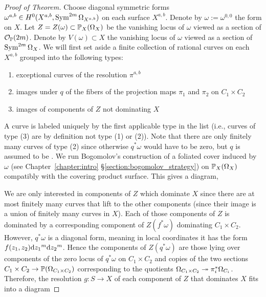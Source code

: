 \documentclass[main.tex]{subfiles}
\begin{document}
\begin{proof}[Proof of Theorem]
Choose diagonal symmetric forms $\omega^{a,b} \in H^0(X^{a,b}, \Sym^{2m}{\Omega_{X^{a,b}}})$ on each surface $X^{a,b}$. Denote by $\omega := \omega^{0,0}$ the form on $X$. Let $Z = Z(\omega) \subset \P_X(\Omega_X)$ be the vanishing locus of $\omega$ viewed as a section of $\cO_{\P}(2m)$. Denote by $V(\omega) \subset X$ the vanishing locus of $\omega$ viewed as a section of $\Sym^{2m}{\Omega_X}$. We will first set aside a finite collection of rational curves on each $X^{a,b}$ grouped into the following types:
\begin{enumerate}
    \item[(1)] exceptional curves of the resolution $\pi^{a,b}$
    \item[(2)] images under $q$ of the fibers of the projection maps $\pi_1$ and $\pi_2$ on $C_1 \times C_2$
    \item[(3)] images of components of $Z$ not dominating $X$ 
\end{enumerate}
A curve is labeled uniquely by the first applicable type in the list (i.e., curves of type (3) are by definition not type (1) or (2)). Note that there are only finitely many curves of type (2) since otherwise $q^* \omega$ would have to be zero, but $q$ is assumed to be \etale. We run Bogomolov's construction of a foliated cover induced by $\omega$ (see Chapter~\ref{chapter:intro} \S\ref{section:bogomolov_strategy}) on $\P_X(\Omega_X)$ compatibly with the covering product surface. This gives a diagram,
\begin{center}
\end{center}
We are only interested in components of $Z$ which dominate $X$ since there are at most finitely many curves that lift to the other components (since their image is a union of finitely many curves in $X$). Each of those components of $Z$ is dominated by a corresponding component of $Z(f^* \omega)$ dominating $C_1 \times C_2$. However, $q^* \omega$ is a diagonal form, meaning in local coordinates it has the form $f(z_1, z_2) \d{z_1}^m \d{z_2}^m$. Hence the components of $Z(q^* \omega)$ are those lying over components of the zero locus of $q^* \omega$ on $C_1 \times C_2$ and copies of the two sections $C_1 \times C_2 \to \P(\Omega_{C_1 \times C_2})$ corresponding to the quotients $\Omega_{C_1 \times C_2} \onto \pi_i^* \Omega_{C_i}$. Therefore, the resolution $g : S \to X$ of each component of $Z$ that dominates $X$ fits into a diagram

\end{proof}
\end{document}
